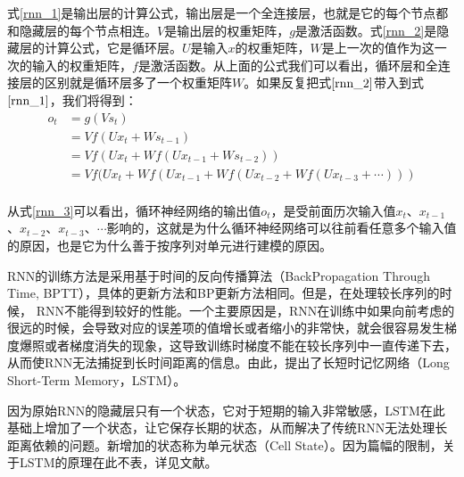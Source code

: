 式\eqref{rnn_1}是输出层的计算公式，输出层是一个全连接层，也就是它的每个节点都和隐藏层的每个节点相连。$V$是输出层的权重矩阵，$g$是激活函数。式\eqref{rnn_2}是隐藏层的计算公式，它是循环层。$U$是输入$x$的权重矩阵，$W$是上一次的值作为这一次的输入的权重矩阵，$f$是激活函数。从上面的公式我们可以看出，循环层和全连接层的区别就是循环层多了一个权重矩阵$W$。如果反复把式$\eqref{rnn_2}$带入到式$\eqref{rnn_1}$，我们将得到：
\begin{equation}
\label{rnn_3}
\begin{aligned}
o_{t}&=g(V s_{t})\\
&=V f(U x_{t}+W s_{t-1})\\
&=V f(U x_{t}+W f(U x_{t-1}+W s_{t-2}))\\
&=V f(U x_{t}+W f(U x_{t-1}+W f(U x_{t-2}+W f(U x_{t-3}+\cdots)))\\
\end{aligned}
\end{equation}

从式\eqref{rnn_3}可以看出，循环神经网络的输出值$o_{t}$，是受前面历次输入值$x_{t}$、$x_{t-1}$、$x_{t-2}$、$x_{t-3}$、$\cdots$影响的，这就是为什么循环神经网络可以往前看任意多个输入值的原因，也是它为什么善于按序列对单元进行建模的原因。

RNN的训练方法是采用基于时间的反向传播算法（BackPropagation Through Time, BPTT），具体的更新方法和BP更新方法相同。但是，在处理较长序列的时候， RNN不能得到较好的性能。一个主要原因是，RNN在训练中如果向前考虑的很远的时候，会导致对应的误差项的值增长或者缩小的非常快，就会很容易发生梯度爆照或者梯度消失的现象，这导致训练时梯度不能在较长序列中一直传递下去，从而使RNN无法捕捉到长时间距离的信息。由此，提出了长短时记忆网络（Long  Short-Term Memory，LSTM）。

因为原始RNN的隐藏层只有一个状态，它对于短期的输入非常敏感，LSTM在此基础上增加了一个状态，让它保存长期的状态，从而解决了传统RNN无法处理长距离依赖的问题。新增加的状态称为单元状态（Cell State）。因为篇幅的限制，关于LSTM的原理在此不表，详见文献\citep{hochreiter1997long}。



